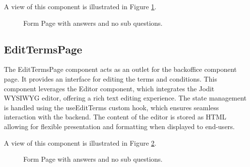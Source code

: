 A view of this component is illustrated in Figure \ref{fig:edit_form}.

\begin{figure}[h]
	\begin{center}
	\end{center}
	\caption{Form Page with answers and no sub questions.}\label{fig:edit_form}
\end{figure}

\subsection{EditTermsPage} \label{edit_terms}

The EditTermsPage component acts as an outlet for the backoffice component page. It provides an interface for editing the terms and conditions. This component leverages the Editor component, which integrates the Jodit WYSIWYG editor, offering a rich text editing experience. The state management is handled using the useEditTerms custom hook, which ensures seamless interaction with the backend.
The content of the editor is stored as HTML allowing for flexible presentation and formatting when displayed to end-users.

A view of this component is illustrated in Figure \ref{fig:edit_terms}.

\begin{figure}[h]
	\begin{center}
	\end{center}
	\caption{Form Page with answers and no sub questions.}\label{fig:edit_terms}
\end{figure}

